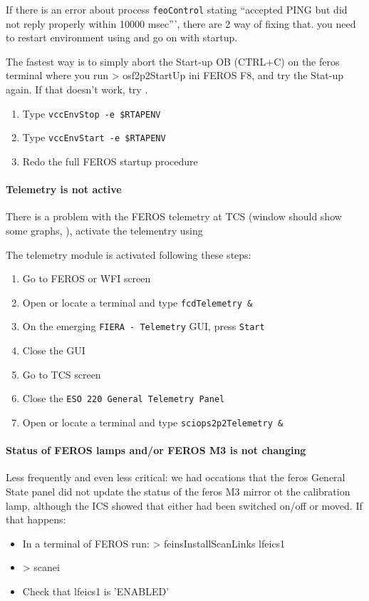 \documentclass[11pt,fleqn,a4paper]{book}
\begin{document}
If there is an error about process \texttt{feoControl} stating ``accepted PING but did not reply properly within 10000 msec''', there are 2  way of fixing that. you need to restart \gls{environment} using  and go on with startup.

\label{proc:restart}
The fastest way is to simply abort the Start-up OB (CTRL+C) on the \gls{feros}  terminal where you run > osf2p2StartUp ini FEROS F8, and try  the Stat-up again. If that doesn't work, try  .


\label{proc:restartenv}
\begin{enumerate}
\item Type \texttt{vccEnvStop -e \$RTAPENV}
\item Type \texttt{vccEnvStart -e \$RTAPENV}
\item Redo the full FEROS startup procedure
\end{enumerate}
 
\paragraph{Telemetry is not active}

There is a problem with the FEROS \gls{telemetry} at TCS (window should show some graphs, ), activate the telementry using 

The \gls{telemetry} module is activated following these steps:
\label{proc:telemetry}
\begin{enumerate}
    \item Go to FEROS or WFI screen
    \item Open or locate a terminal and type \texttt{\gls{fcdTelemetry} \&}
    \item On the emerging \texttt{FIERA - Telemetry} GUI, press \texttt{Start}
    \item Close the GUI
    \item Go to TCS screen
    \item Close the \texttt{ESO 220 General Telemetry Panel}
    \item Open or locate a terminal and type \texttt{sciops2p2Telemetry \&}
\end{enumerate}

\paragraph{Status of FEROS lamps and/or FEROS M3 is not changing}
 Less frequently and even less critical: we had occations that the \gls{feros} General State panel did not update the status of the \gls{feros} M3 mirror ot the calibration lamp, although the ICS showed  that either had been switched on/off or moved. If that happens:\\
 \begin{itemize}
 	\item In a terminal of FEROS run: > feinsInstallScanLinks lfeics1
 	\item > scanei
 	\item Check that lfeics1 is 'ENABLED'
 \end{itemize} 
\end{document}
